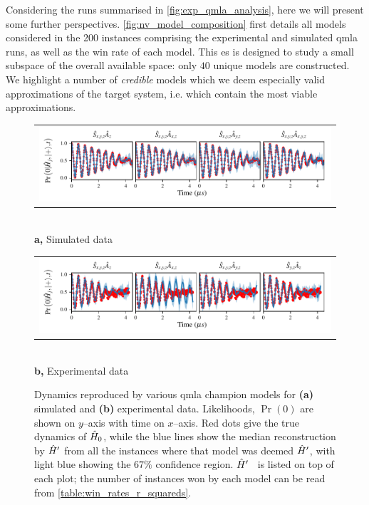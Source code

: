 Considering the \glspl{run} summarised in \cref{fig:exp_qmla_analysis}, here we will present some further perspectives.
\cref{fig:nv_model_composition} first details all models considered in the 200 \glspl{instance} 
    comprising the experimental and simulated \gls{qmla} \glspl{run}, 
    as well as the  \gls{win rate}  of each model. 
This \gls{es} is designed to study a small subspace of the overall available space:
    only $40$ unique models are constructed. 
We highlight a number of \emph{credible} models which we deem especially valid approximations of the target system, 
    i.e. which contain the most viable approximations. 
\par 

\begin{figure}[t]
    \centering
    \begin{tabular}{@{}c@{}}
        \includegraphics[scale=0.99]{experimental_study/figures/reproduced_dyamics_sim.pdf}
    \end{tabular}
    \\ \small \textbf{a,} Simulated data
    \centering

    \begin{tabular}{@{}c@{}}
        \includegraphics[scale=0.99]{experimental_study/figures/reproduced_dyamics_exp.pdf}
    \end{tabular}
    \\ \small \textbf{b,} Experimental data

    \caption[Dynamics reproduced by \gls{qmla} \glspl{champion model} for simulated/experimental data]{
        Dynamics reproduced by various \gls{qmla} \glspl{champion model} for \textbf{(a)} simulated and \textbf{(b)} experimental data. 
        Likelihoods, $\Pr(0)$ are shown on $y$--axis with time on $x$--axis. 
        Red dots give the true dynamics of $\hat{H}_0$, while the blue lines show the median reconstruction by $\hat{H}^{\prime}$
        from all the \glspl{instance} where that model was deemed $\hat{H}^{\prime}$, with light blue showing the $67\%$ confidence region.
        $\hat{H}^{\prime}$ \ is listed on top of each plot; the number of \glspl{instance} won by each model can be read from \cref{table:win_rates_r_squareds}.
        \figtableref 
        }
    \label{fig:nv_model_dynamics}
\end{figure}

